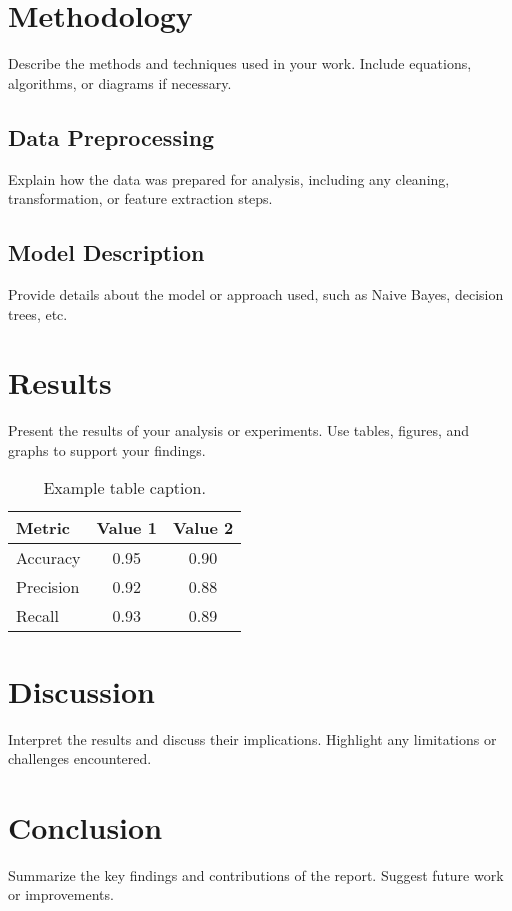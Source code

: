\documentclass[a4paper,12pt]{article}
\begin{document}
\section{Methodology}
Describe the methods and techniques used in your work. Include equations, algorithms, or diagrams if necessary.

\subsection{Data Preprocessing}
Explain how the data was prepared for analysis, including any cleaning, transformation, or feature extraction steps.

\subsection{Model Description}
Provide details about the model or approach used, such as Naive Bayes, decision trees, etc.

\section{Results}
Present the results of your analysis or experiments. Use tables, figures, and graphs to support your findings.

\begin{table}[H]
    \centering
    \begin{tabular}{lcc}
        \toprule
        Metric & Value 1 & Value 2 \\
        \midrule
        Accuracy & 0.95 & 0.90 \\
        Precision & 0.92 & 0.88 \\
        Recall & 0.93 & 0.89 \\
        \bottomrule
    \end{tabular}
    \caption{Example table caption.}
    \label{tab:example}
\end{table}

\section{Discussion}
Interpret the results and discuss their implications. Highlight any limitations or challenges encountered.

\section{Conclusion}
Summarize the key findings and contributions of the report. Suggest future work or improvements.
\end{document}

